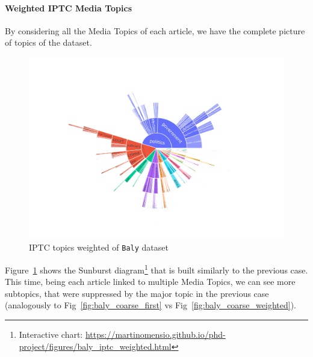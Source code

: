 

\paragraph{Weighted IPTC Media Topics}

By considering all the Media Topics of each article, we have the complete picture of topics of the dataset. 

\begin{figure}[!htbp]
    \centering
    \includegraphics[trim={2.2cm 2cm 2.2cm 2cm},clip,width=\linewidth]{figures/baly_iptc_weighted.pdf}
    \caption{IPTC topics weighted of \texttt{Baly} dataset}
    \label{fig:baly_iptc_weighted}
\end{figure}

Figure~\ref{fig:baly_iptc_weighted} shows the Sunburst diagram\footnote{Interactive chart: \url{https://martinomensio.github.io/phd-project/figures/baly_iptc_weighted.html}} that is built similarly to the previous case. This time, being each article linked to multiple Media Topics, we can see more subtopics, that were suppressed by the major topic in the previous case (analogously to Fig~\ref{fig:baly_coarse_first} vs Fig~\ref{fig:baly_coarse_weighted}).


